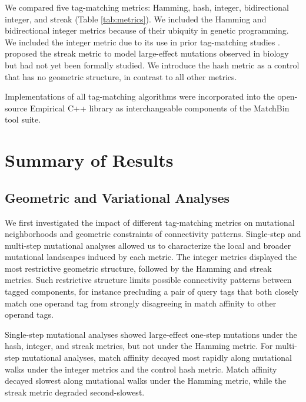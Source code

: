 

We compared five tag-matching metrics: Hamming, hash, integer, bidirectional integer, and streak (Table \ref{tab:metrics}).
We included the Hamming and bidirectional integer metrics because of their ubiquity in genetic programming.
We included the integer metric due to its use in prior tag-matching studies \citep{spector2011tag,spector2012tag}.
\cite{downing2015intelligence} proposed the streak metric to model large-effect mutations observed in biology but had not yet been formally studied.
We introduce the hash metric as a control that has no geometric structure, in contrast to all other metrics.

Implementations of all tag-matching algorithms were incorporated into the open-source Empirical C++ library \citep{charles_ofria_2019_2575607} as interchangeable components of the MatchBin tool suite.

\section{Summary of Results}


\subsection{Geometric and Variational Analyses}

We first investigated the impact of different tag-matching metrics on mutational neighborhoods and geometric constraints of connectivity patterns.
Single-step and multi-step mutational analyses allowed us to characterize the local and broader mutational landscapes induced by each metric.
The integer metrics displayed the most restrictive geometric structure, followed by the Hamming and streak metrics.
Such restrictive structure limits possible connectivity patterns between tagged components, for instance precluding a pair of query tags that both closely match one operand tag from strongly disagreeing in match affinity to other operand tags.

Single-step mutational analyses showed large-effect one-step mutations under the hash, integer, and streak metrics, but not under the Hamming metric.
For multi-step mutational analyses, match affinity decayed most rapidly along mutational walks under the integer metrics and the control hash metric.
Match affinity decayed slowest along mutational walks under the Hamming metric, while the streak metric degraded second-slowest.

